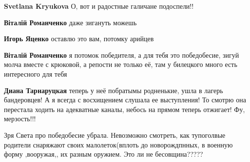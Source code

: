\begin{itemize}
\begin{itemize}
 
\textbf{Svetlana Kryukova} О, вот и радостные галичане подоспели!!

 
\textbf{Віталій Романченко} даже зигануть можешь

 
\textbf{Игорь Яценко} оставлю это вам, потомку арийцев

 
\textbf{Віталій Романченко} я потомок победителя, а для тебя это победобесие, зигуй молча вместе с крюковой, а репости не только её, там у билецкого много есть интересного для тебя

 
\textbf{Диана Тарнаруцкая} теперь у неё побратымы родненькие, ушла в лагерь бандеровцев! А я всегда с восхищением слушала ее выступления! То смотрю она перестала ходить на адекватные каналы, небось на прямом теперь отжигает! Фу, мерзость!!!

 
Зря Света про победобесие убрала. Невозможно смотреть, как тупоголвые родители
снаряжают своих малолеток(вплоть до новорождпнных, в военную форму ,вооружая,, их
разным оружием. Это ли не бесовщина?????

\end{itemize}
\end{itemize}

